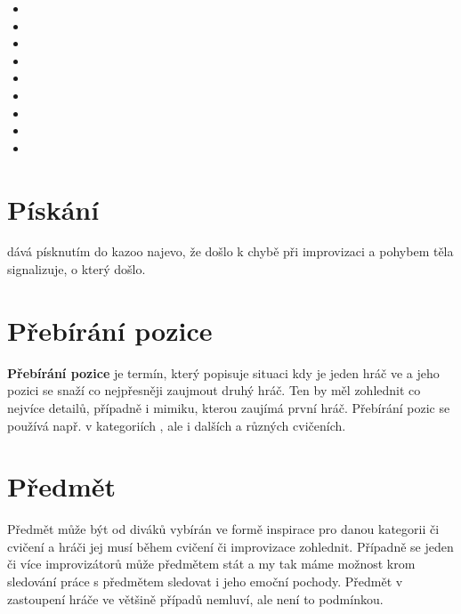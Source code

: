  
\label{:kategorie:porovnávací kategorie} 
\begin{multicols}{2}\begin{itemize} 
\item  {}  
\item  {}  
\item  {}  
\item  {}  
\item  {}  
\item  {}  
\item  {}  
\item  {}  
\item  {}  
\end{itemize} 
\end{multicols} 
\needspace{5cm} \section{Pískání} \label{pískání}  dává písknutím do kazoo najevo, že došlo k chybě při improvizaci a pohybem těla signalizuje, o který  došlo. 
 
 
\needspace{5cm} \section{Přebírání pozice} \label{přebírání pozice} \textbf{Přebírání pozice}{} je termín, který popisuje situaci kdy je jeden hráč ve  a jeho pozici se snaží co nejpřesněji zaujmout druhý hráč. Ten by měl zohlednit co nejvíce detailů, případně i mimiku, kterou zaujímá první hráč. Přebírání pozic se používá např. v kategoriích ,  ale i dalších a různých cvičeních. 
 
 
\needspace{5cm} \section{Předmět} \label{předmět} Předmět může být od diváků vybírán ve formě inspirace pro danou kategorii či cvičení a hráči jej musí během cvičení či improvizace zohlednit. Případně se jeden či více improvizátorů může předmětem stát a my tak máme možnost krom sledování práce s předmětem sledovat i jeho emoční pochody. Předmět v zastoupení hráče ve většině případů nemluví, ale není to podmínkou. 
 
